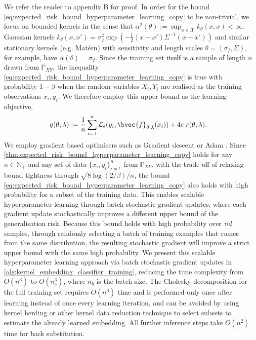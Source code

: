 \documentclass{article}
\begin{document}
	We refer the reader to appendix B for proof. In order for the bound \eqref{eq:expected_risk_bound_hyperparameter_learning_copy} to be non-trivial, we focus on bounded kernels in the sense that $\alpha^{2}(\theta) := \sup_{x \in \mathcal{X}} k_{\theta}(x, x) < \infty$. Gaussian kernels $k_{\theta}(x, x') = \sigma_{f}^{2} \exp{( - \frac{1}{2}(x - x') \Sigma^{-1} (x - x') )}$ and similar stationary kernels (e.g. Mat\'{e}rn) with sensitivity and length scales $\theta = (\sigma_{f}, \Sigma)$, for example, have $\alpha(\theta) = \sigma_{f}$. Since the training set itself is a sample of length $n$ drawn from $\mathbb{P}_{X Y}$, the inequality \eqref{eq:expected_risk_bound_hyperparameter_learning_copy} is true with probability $1 - \beta$ when the random variables $X_{i}, Y_{i}$ are realised as the training observations $x_{i}, y_{i}$. We therefore employ this upper bound as the learning objective,
	\begin{equation}
		q(\theta, \lambda) := \frac{1}{n} \sum_{i = 1}^{n} \mathcal{L}_{\epsilon}(y_{i}, \bvec{f}_{\theta, \lambda}(x_{i})) + 4 e \; r(\theta, \lambda).
	\label{eq:learning_objective}
	\end{equation}
	We employ gradient based optimisers such as Gradient descent or Adam \citep{kingma2014adam}. Since \cref{thm:expected_risk_bound_hyperparameter_learning_copy} holds for any $n \in \mathbb{N}_{+}$ and any set of data $\{x_{i}, y_{i}\}_{i = 1}^{n}$ from $\mathbb{P}_{X Y}$, with the trade-off of relaxing bound tightness through $\sqrt{8 \log{(2 / \beta)} / n}$, the bound \eqref{eq:expected_risk_bound_hyperparameter_learning_copy} also holds with high probability for a subset of the training data. This enables scalable hyperparameter learning through batch stochastic gradient updates, where each gradient update stochastically improves a different upper bound of the generalisation risk. Because this bound holds with high probability over \textit{iid} samples, through randomly selecting a batch of training examples that comes from the same distribution, the resulting stochastic gradient will improve a strict upper bound with the same high probability. We present this scalable hyperparameter learning approach via batch stochastic gradient updates in \cref{alg:kernel_embedding_classifier_training}, reducing the time complexity from $O(n^{3})$ to $O(n_{b}^{3})$, where $n_{b}$ is the batch size. The Cholesky decomposition for the full training set requires $O(n^{3})$ time and is performed only once after learning instead of once every learning iteration, and can be avoided by using kernel herding \citep{chen2010super} or other kernel data reduction technique to select subsets to estimate the already learned embedding. All further inference steps take $O(n^{2})$ time for back substitution. 
	
\end{document}
